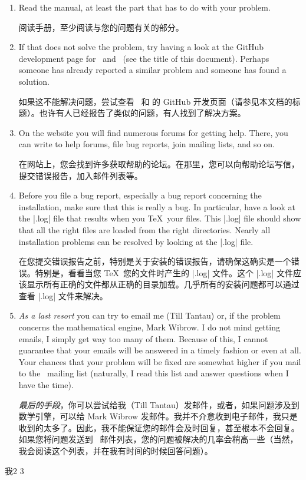 \begin{enumerate}
    \item Read the manual, at least the part that has to do with your
        problem.

        阅读手册，至少阅读与您的问题有关的部分。
    \item If that does not solve the problem, try having a look at the
        GitHub development page for \pgfname\ and \tikzname\ (see the
        title of this document). Perhaps someone has already reported a
        similar problem and someone has found a solution.

        如果这不能解决问题，尝试查看 \pgfname\ 和 \tikzname 的 GitHub 开发页面（请参见本文档的标题）。也许有人已经报告了类似的问题，有人找到了解决方案。
    \item On the website you will find numerous forums for getting help.
        There, you can write to help forums, file bug reports, join mailing
        lists, and so on.

        在网站上，您会找到许多获取帮助的论坛。在那里，您可以向帮助论坛写信，提交错误报告，加入邮件列表等。
    \item Before you file a bug report, especially a bug report concerning
        the installation, make sure that this is really a bug. In particular,
        have a look at the |.log| file that results when you \TeX\ your
        files. This |.log| file should show that all the right files are
        loaded from the right directories. Nearly all installation problems
        can be resolved by looking at the |.log| file.

        在您提交错误报告之前，特别是关于安装的错误报告，请确保这确实是一个错误。特别是，看看当您 \TeX\ 您的文件时产生的 |.log| 文件。这个 |.log| 文件应该显示所有正确的文件都从正确的目录加载。几乎所有的安装问题都可以通过查看 |.log| 文件来解决。
    \item \emph{As a last resort} you can try to email me (Till Tantau) or,
        if the problem concerns the mathematical engine, Mark Wibrow. I do
        not mind getting emails, I simply get way too many of them. Because
        of this, I cannot guarantee that your emails will be answered in a 
        timely fashion or even at all. Your chances that your problem will
        be fixed are somewhat higher if you mail to the \pgfname\ mailing
        list (naturally, I read this list and answer questions when I have
        the time).

        \emph{最后的手段}，你可以尝试给我（Till Tantau）发邮件，或者，如果问题涉及到数学引擎，可以给 Mark Wibrow 发邮件。我并不介意收到电子邮件，我只是收到的太多了。因此，我不能保证您的邮件会及时回复，甚至根本不会回复。如果您将问题发送到 \pgfname\ 邮件列表，您的问题被解决的几率会稍高一些（当然，我会阅读这个列表，并在我有时间的时候回答问题）。
\end{enumerate}
我2 3

